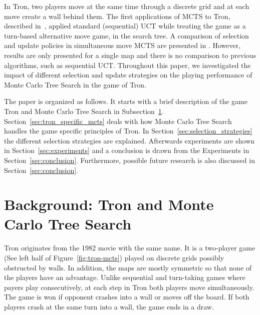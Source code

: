 \documentclass{article}
\begin{document}
In Tron, two players move at the same time through a discrete grid and at each move create a wall behind them. 
The first applications of MCTS to Tron, described in~\cite{tron_cig,teuling_tron}, applied standard (sequential) UCT while treating the game as a turn-based alternative move game, in the search tree. A comparison of selection and update policies in simultaneous move MCTS are presented in \cite{cig_paper}. However, results are only presented for a single map and there is no comparison to previous algorithms, such as sequential UCT.
Throughout this paper, we investigated the impact of different selection and update strategies on the playing performance of Monte Carlo Tree Search in the game of Tron.

The paper is organized as follows.
It starts with a brief description of the game Tron and Monte Carlo Tree Search in Subsection~\ref{sec:background}. 
Section~\ref{sec:tron_specific_mcts} deals with how Monte Carlo Tree Search handles the game specific principles of Tron. In Section~\ref{sec:selection_strategies} the different selection strategies are explained. Afterwards experiments are shown in Section~\ref{sec:experiments} and a conclusion is drawn from the Experiments in Section~\ref{sec:conclusion}. Furthermore, possible future research is also discussed in Section~\ref{sec:conclusion}.

\section{Background: Tron and Monte Carlo Tree Search}

\label{sec:background}
Tron originates from the 1982 movie with the same name. It is a two-player game (See left half of Figure~\ref{fig:tron-mcts}) played on discrete grids possibly obstructed by walls. In addition, the maps are mostly symmetric so that none of the players have an advantage. Unlike sequential and turn-taking games where payers play consecutively, at each step in Tron both players move simultaneously. The game is won if opponent crashes into a wall or moves off the board. If both players crash at the same turn into a wall, the game ends in a draw.
\end{document}
